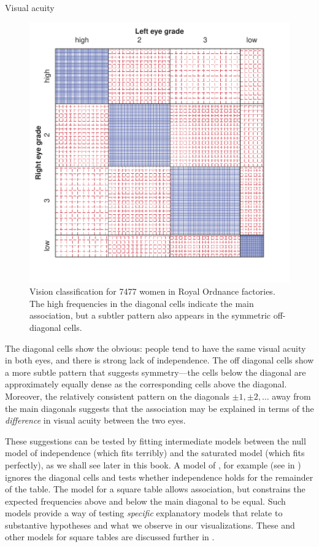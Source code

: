 \documentclass[10pt,krantz2]{krantz}\usepackage[]{graphicx}\usepackage[]{color}
\newenvironment{knitrout}{}{} %
\renewenvironment{knitrout}{\small\renewcommand{\baselinestretch}{.85}}{} %
\begin{document}
\begin{Example}[vision1]{Visual acuity}
\begin{knitrout}
\begin{figure}[!htbp]
\centerline{\includegraphics[width=.7\textwidth]{ch04/fig/VA-sieve2-1} }

\caption[Vision classification for 7477 women in Royal Ordnance factories]{Vision classification for 7477 women in Royal Ordnance factories. The high frequencies in the diagonal cells indicate the main association, but a subtler pattern also appears in the symmetric off-diagonal cells.}\label{fig:VA-sieve2}
\end{figure}


\end{knitrout}

The diagonal cells show the obvious:
people tend to have the same visual acuity in both eyes, and there is
strong lack of independence.  The off diagonal cells show a more subtle
pattern that suggests symmetry---the cells below the diagonal
are approximately equally dense as the corresponding cells above the diagonal.
Moreover, the relatively consistent pattern on the diagonals
$\pm 1, \pm 2, \dots$ away from the main diagonals suggests
that the association may be explained in terms of the \emph{difference}
in visual acuity between the two eyes.

These suggestions can be tested by fitting  intermediate models
between the null model of independence (which fits terribly)
and the saturated model (which fits perfectly),
as we shall see later in this book.
A model of , for example
(see  in )
ignores the diagonal cells and tests whether independence holds
for the remainder of the table.
The  model for a square table allows association,
but constrains the expected frequencies above and below the
main diagonal to be equal.
Such models provide a
way of testing \emph{specific} explanatory models that relate to
substantive hypotheses and what we observe in our visualizations.
These and other models for square tables
are discussed further in .
\end{Example}
\end{document}

